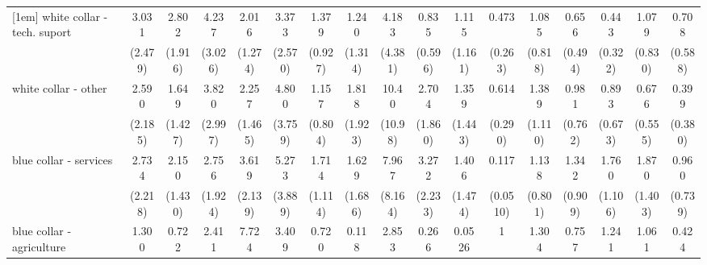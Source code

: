 {\begin{tabular}{l*{16}{c}}
[1em]
white collar - tech. suport&       3.031         &       2.802         &       4.237\sym{*}  &       2.016         &       3.373         &       1.379         &       1.240         &       4.183         &       0.835         &       1.115         &       0.473         &       1.085         &       0.656         &       0.443         &       1.079         &       0.708         \\
                    &     (2.479)         &     (1.916)         &     (3.026)         &     (1.274)         &     (2.570)         &     (0.927)         &     (1.314)         &     (4.381)         &     (0.596)         &     (1.161)         &     (0.263)         &     (0.818)         &     (0.494)         &     (0.322)         &     (0.830)         &     (0.588)         \\
[1em]
white collar - other&       2.590         &       1.649         &       3.820         &       2.257         &       4.800\sym{*}  &       1.157         &       1.818         &       10.40\sym{*}  &       2.704         &       1.359         &       0.614         &       1.389         &       0.981         &       0.893         &       0.676         &       0.399         \\
                    &     (2.185)         &     (1.427)         &     (2.997)         &     (1.465)         &     (3.759)         &     (0.804)         &     (1.923)         &     (10.98)         &     (1.860)         &     (1.443)         &     (0.290)         &     (1.110)         &     (0.762)         &     (0.673)         &     (0.555)         &     (0.380)         \\
[1em]
blue collar - services&       2.734         &       2.150         &       2.756         &       3.619\sym{*}  &       5.273\sym{*}  &       1.714         &       1.629         &       7.967\sym{*}  &       3.272         &       1.406         &       0.117\sym{***}&       1.138         &       1.342         &       1.760         &       1.870         &       0.960         \\
                    &     (2.218)         &     (1.430)         &     (1.924)         &     (2.139)         &     (3.889)         &     (1.114)         &     (1.686)         &     (8.164)         &     (2.233)         &     (1.474)         &    (0.0510)         &     (0.801)         &     (0.909)         &     (1.106)         &     (1.403)         &     (0.739)         \\
[1em]
blue collar - agriculture&       1.300         &       0.722         &       2.411         &       7.724\sym{**} &       3.409         &       0.720         &       0.118         &       2.853         &       0.266         &      0.0526\sym{*}  &           1         &       1.304         &       0.757         &       1.241         &       1.061         &       0.424         \\

\end{tabular}}
